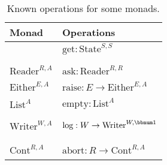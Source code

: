 \begin{table}
\begin{centering}
\begin{tabular}{|>{\centering}m{1.6cm}|>{\centering}m{8.5cm}|}
\hline 
\textbf{\small{}Monad} & \textbf{\small{}Operations}\tabularnewline
\hline 
\hline 
{\small{}$\text{State}^{S,A}$} & {\small{}$\text{get}:\text{State}^{S,S}$}\\
{\small{}$\text{set}:S\rightarrow\text{State}^{S,\bbnum 1}$}\\
{\small{}$\text{update}:(S\rightarrow S)\rightarrow\text{State}^{S,\bbnum 1}$}\tabularnewline
\hline 
{\small{}$\text{Reader}^{R,A}$} & {\small{}$\text{ask}:\text{Reader}^{R,R}$}\\
{\small{}$\text{local}:R\times\text{Reader}^{R,A}\rightarrow\text{Reader}^{R,A}$}\tabularnewline
\hline 
{\small{}$\text{Either}^{E,A}$} & {\small{}$\text{raise}:E\rightarrow\text{Either}^{E,A}$}\\
{\small{}$\text{handle}:(E\rightarrow\text{Either}^{E,A})\times\text{Either}^{E,A}\rightarrow\text{Either}^{E,A}$}\tabularnewline
\hline 
{\small{}$\text{List}^{A}$} & {\small{}$\text{empty}:\text{List}^{A}$}\\
{\small{}$\text{append}:\text{List}^{A}\times\text{List}^{A}\rightarrow\text{List}^{A}$}\\
{\small{}$\text{filter}:\text{List}^{A}\times(A\rightarrow\bbnum 2)\rightarrow\text{List}^{A}$}\tabularnewline
\hline 
{\small{}$\text{Writer}^{W,A}$} & {\small{}$\text{log}:W\rightarrow\text{Writer}^{W,\bbnum 1}$}\\
{\small{}$\text{collect}:\text{Writer}^{W,A}\rightarrow\text{Writer}^{W,A\times W}$}\\
{\small{}$\text{process}:\text{Writer}^{W,A\times(W\rightarrow W)}\rightarrow\text{Writer}^{W,A}$}\\
{\small{}$\text{clear}:\text{Writer}^{W,A}\rightarrow\text{Writer}^{W,A}$}\tabularnewline
\hline 
{\small{}$\text{Cont}^{R,A}$} & {\small{}$\text{abort}:R\rightarrow\text{Cont}^{R,A}$}\\
{\small{}$\text{callcc}:((A\rightarrow\text{Cont}^{R,B})\rightarrow\text{Cont}^{R,A})\rightarrow\text{Cont}^{R,A}$}\tabularnewline
\hline 
\end{tabular}
\par\end{centering}
\caption{Known operations for some monads.\label{tab:effectful-operations-for-some-monads}}

\end{table}

